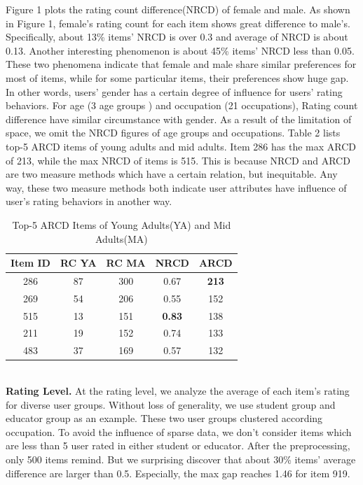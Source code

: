 \documentclass{llncs}
\begin{document}
	Figure 1 plots the rating count difference(NRCD) of female and male.
	As shown in Figure 1, female's rating count for each item shows great difference to male's. Specifically, about 13\% items' NRCD is over 0.3
	and average of NRCD is about 0.13. Another interesting phenomenon is about 45\% items' NRCD less than 0.05. These two phenomena indicate that female
	and male share similar preferences for most of items, while for some particular items, their preferences show huge gap.
	In other words, users' gender has a certain degree of influence for users' rating behaviors. For age (3 age groups )
	and occupation (21 occupations), Rating count difference have similar circumstance with gender. As a result of the limitation of space,
	we omit the NRCD figures of age groups and occupations. Table 2 lists top-5 ARCD items of young adults and mid adults.
	Item 286 has the max ARCD of 213, while the max NRCD of items is 515. This is because NRCD and ARCD are two measure methods which have
	a certain relation, but inequitable. Any way, these two measure methods both
	indicate user attributes have influence of user's rating behaviors in another way.
	\begin{table}
		\centering
		\caption{Top-5 ARCD Items of Young Adults(YA) and Mid Adults(MA)}
		\begin{tabular}{c|c|c|c|c} \hline
			Item ID &RC YA &RC MA &NRCD & ARCD \\ \hline \hline
			286	&87	&300	&0.67	&\textbf{213}\\ \hline
			269	&54	&206	&0.55	&152\\ \hline
			515	&13	&151	&\textbf{0.83}	&138\\ \hline
			211	&19	&152	&0.74   &133\\ \hline
			483	&37	&169	&0.57	&132\\ \hline
		\end{tabular}
	\end{table}
	\\
	\noindent\textbf{Rating Level.} At the rating level, we analyze the
	average of each item's rating for diverse user groups.
	Without loss of generality, we use student group and educator group as an example.
	These two user groups clustered according occupation.
	To avoid the influence of sparse data,
	we don't consider items which are less than 5 user rated in either student or educator.
	After the preprocessing, only 500 items remind. But we surprising discover that about 30\% items'
	average difference are larger than 0.5. Especially, the max gap reaches 1.46 for item 919.
\end{document}
